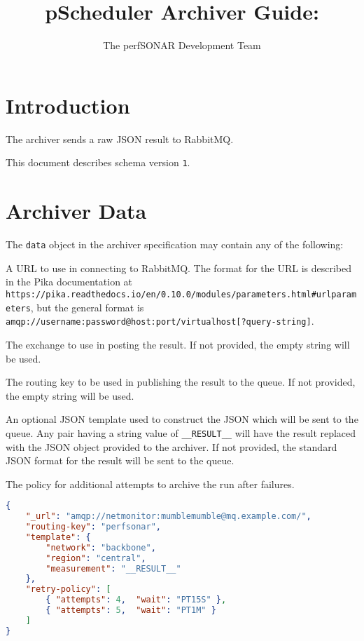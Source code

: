 \documentclass[10pt]{article}
\title{pScheduler Archiver Guide: {\it \archivername}}
\author{The perfSONAR Development Team}
\begin{document}
\maketitle


%
%

\section{Introduction}

The {\tt \archivername} archiver sends a raw JSON result to RabbitMQ.

This document describes schema version {\tt 1}.


%
%

\section{Archiver Data}

The {\tt data} object in the archiver specification may contain any of
the following:

 A URL to use in connecting to RabbitMQ.  The
format for the URL is described in the Pika documentation at {\tt
  https://pika.readthedocs.io/en/0.10.0/modules/parameters.html\#urlparameters},
but the general format is {\tt
  amqp://username:password@host:port/virtualhost[?query-string]}.

 The exchange to use in posting the
result.  If not provided, the empty string will be used.

 The routing key to be used in
publishing the result to the queue.  If not provided, the empty string
will be used.

 An optional JSON template used to
construct the JSON which will be sent to the queue.  Any pair having a
string value of {\tt __RESULT__} will have the result replaced with
the JSON object provided to the archiver.  If not provided, the
standard JSON format for the result will be sent to the queue.

 The policy for additional
attempts to archive the run after failures.


\example
\begin{lstlisting}[language=json]
{
    "_url": "amqp://netmonitor:mumblemumble@mq.example.com/",
    "routing-key": "perfsonar",
    "template": {
        "network": "backbone",
        "region": "central",
        "measurement": "__RESULT__"
    },
    "retry-policy": [
        { "attempts": 4,  "wait": "PT15S" },
        { "attempts": 5,  "wait": "PT1M" }
    ]
}
\end{lstlisting}
\end{document}
